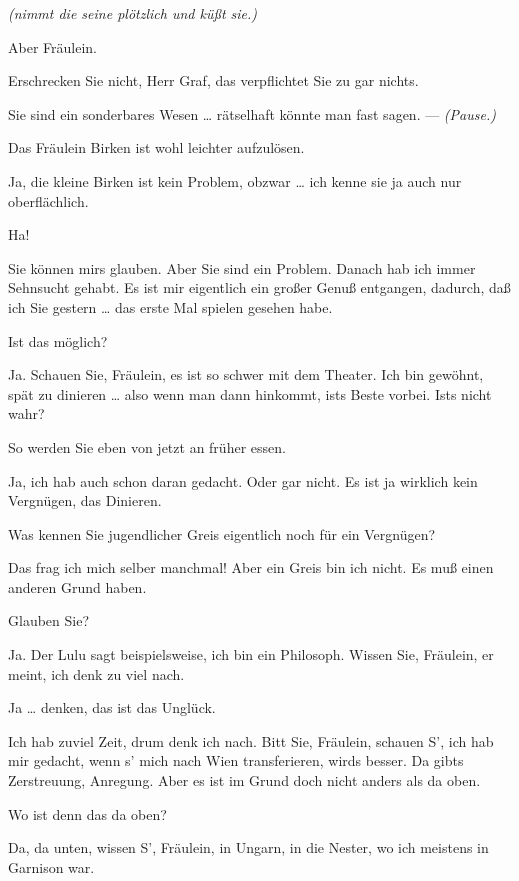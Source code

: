 \documentclass[
	final,
	a4paper,
	ngerman,
	mpinclude = true, %
	twoside = true,
	open = right,
	cleardoublepage = plain,
	DIV = 13,
	BCOR = 1cm,
	titlepage = firstiscover,
	]{scrbook}
\newcommand{\direction}[1]{\textit{(#1)}}
\newcommand{\thecharacter}[1]{\textup{\textsc{#1}}}
\newcommand{\theschauspielerin}{\thecharacter{Schauspielerin}}
\newcommand{\thegraf}{\thecharacter{Graf}}
\newcommand{\character}[1]{\item[#1:]}
\newcommand{\schauspielerin}{\character{\theschauspielerin}}
\newcommand{\graf}{\character{\thegraf}}
\begin{document}
\begin{play}
	\schauspielerin
	\direction{nimmt die seine plötzlich und küßt sie.}

	\graf
	Aber Fräulein.

	\schauspielerin
	Erschrecken Sie nicht, Herr Graf, das verpflichtet Sie zu gar nichts.

	\graf
	Sie sind ein sonderbares Wesen \ldots{} rätselhaft könnte man fast sagen. --- \direction{Pause.}

	\schauspielerin
	Das Fräulein Birken ist wohl leichter aufzulösen.

	\graf
	Ja, die kleine Birken ist kein Problem, obzwar \ldots{} ich kenne sie ja auch nur oberflächlich.

	\schauspielerin
	Ha!

	\graf
	Sie können mirs glauben. Aber Sie sind ein Problem. Danach hab ich immer Sehnsucht gehabt. Es ist mir eigentlich ein großer Genuß entgangen, dadurch, daß ich Sie gestern \ldots{} das erste Mal spielen gesehen habe.

	\schauspielerin
	Ist das möglich?

	\graf
	Ja. Schauen Sie, Fräulein, es ist so schwer mit dem Theater. Ich bin gewöhnt, spät zu dinieren \ldots{} also wenn man dann hinkommt, ists Beste vorbei. Ists nicht wahr?

	\schauspielerin
	So werden Sie eben von jetzt an früher essen.

	\graf
	Ja, ich hab auch schon daran gedacht. Oder gar nicht. Es ist ja wirklich kein Vergnügen, das Dinieren.

	\schauspielerin
	Was kennen Sie jugendlicher Greis eigentlich noch für ein Vergnügen?

	\graf
	Das frag ich mich selber manchmal! Aber ein Greis bin ich nicht. Es muß einen anderen Grund haben.

	\schauspielerin
	Glauben Sie?

	\graf
	Ja. Der Lulu sagt beispielsweise, ich bin ein Philosoph. Wissen Sie, Fräulein, er meint, ich denk zu viel nach.

	\schauspielerin
	Ja \ldots{} denken, das ist das Unglück.

	\graf
	Ich hab zuviel Zeit, drum denk ich nach. Bitt Sie, Fräulein, schauen S', ich hab mir gedacht, wenn s' mich nach Wien transferieren, wirds besser. Da gibts Zerstreuung, Anregung. Aber es ist im Grund doch nicht anders als da oben.

	\schauspielerin
	Wo ist denn das da oben?

	\graf
	Da, da unten, wissen S', Fräulein, in Ungarn, in die Nester, wo ich meistens in Garnison war.


\end{play}
\end{document}
